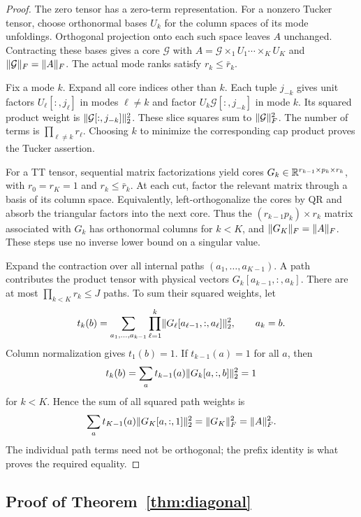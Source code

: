 \begin{proof}
The zero tensor has a zero-term representation. For a nonzero Tucker tensor, choose orthonormal bases $U_k$ for the column spaces of its mode unfoldings. Orthogonal projection onto each such space leaves $A$ unchanged. Contracting these bases gives a core $\mathcal G$ with $A=\mathcal G\times_1U_1\cdots\times_KU_K$ and $\lVert \mathcal G\rVert_F=\lVert A\rVert_F$. The actual mode ranks satisfy $r_k\le\bar r_k$.

Fix a mode $k$. Expand all core indices other than $k$. Each tuple $j_{-k}$ gives unit factors $U_\ell[:,j_\ell]$ in modes $\ell\ne k$ and factor $U_k\mathcal G[:,j_{-k}]$ in mode $k$. Its squared product weight is $\lVert \mathcal G[:,j_{-k}]\rVert_2^2$. These slice squares sum to $\lVert \mathcal G\rVert_F^2$. The number of terms is $\prod_{\ell\ne k}r_\ell$. Choosing $k$ to minimize the corresponding cap product proves the Tucker assertion.

For a TT tensor, sequential matrix factorizations yield cores $G_k\in\mathbb R^{r_{k-1}\times p_k\times r_k}$, with $r_0=r_K=1$ and $r_k\le\bar r_k$. At each cut, factor the relevant matrix through a basis of its column space. Equivalently, left-orthogonalize the cores by QR and absorb the triangular factors into the next core. Thus the $(r_{k-1}p_k)\times r_k$ matrix associated with $G_k$ has orthonormal columns for $k<K$, and $\lVert G_K\rVert_F=\lVert A\rVert_F$. These steps use no inverse lower bound on a singular value.

Expand the contraction over all internal paths $(a_1,\ldots,a_{K-1})$. A path contributes the product tensor with physical vectors $G_k[a_{k-1},:,a_k]$. There are at most $\prod_{k<K}r_k\le J$ paths. To sum their squared weights, let
\[
 t_k(b)=\sum_{a_1,\ldots,a_{k-1}}
 \prod_{\ell=1}^k\lVert G_\ell[a_{\ell-1},:,a_\ell]\rVert_2^2,
 \qquad a_k=b.
\]
Column normalization gives $t_1(b)=1$. If $t_{k-1}(a)=1$ for all $a$, then
\[
 t_k(b)=\sum_a t_{k-1}(a)\lVert G_k[a,:,b]\rVert_2^2=1
\]
for $k<K$. Hence the sum of all squared path weights is
\[
 \sum_a t_{K-1}(a)\lVert G_K[a,:,1]\rVert_2^2=\lVert G_K\rVert_F^2=\lVert A\rVert_F^2.
\]
The individual path terms need not be orthogonal; the prefix identity is what proves the required equality.
\end{proof}

\subsection{Proof of Theorem~\ref{thm:diagonal}}

